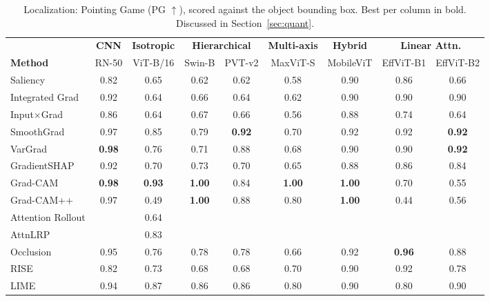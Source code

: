 \documentclass[final,5p,times,twocolumn]{elsarticle}
\newcommand{\best}[1]{\textbf{#1}}
\newcommand{\nd}{\textemdash}
\begin{document}
\begin{table}[t]
  \centering
  \caption{Localization: Pointing Game (PG $\uparrow$), scored against the object bounding box. Best per column in bold. Discussed in Section~\ref{sec:quant}.}
  \label{tab:pg}
  \setlength{\tabcolsep}{4pt}
  \begin{tabular}{l cc cc cc cc}
    \toprule
     & \multicolumn{1}{c}{\textbf{CNN}} & \multicolumn{1}{c}{\textbf{Isotropic}} & \multicolumn{2}{c}{\textbf{Hierarchical}} & \multicolumn{1}{c}{\textbf{Multi-axis}} & \multicolumn{1}{c}{\textbf{Hybrid}} & \multicolumn{2}{c}{\textbf{Linear Attn.}} \\
    \cmidrule(lr){2-2} \cmidrule(lr){3-3} \cmidrule(lr){4-5} \cmidrule(lr){6-6} \cmidrule(lr){7-7} \cmidrule(lr){8-9}
    \textbf{Method} & RN-50 & ViT-B/16 & Swin-B & PVT-v2 & MaxViT-S & MobileViT & EffViT-B1 & EffViT-B2 \\
    \midrule
    Saliency & 0.82 & 0.65 & 0.62 & 0.62 & 0.58 & 0.90 & 0.86 & 0.66 \\
    Integrated Grad & 0.92 & 0.64 & 0.66 & 0.64 & 0.62 & 0.90 & 0.90 & 0.90 \\
    Input$\times$Grad & 0.86 & 0.64 & 0.67 & 0.66 & 0.56 & 0.88 & 0.74 & 0.64 \\
    SmoothGrad & 0.97 & 0.85 & 0.79 & \best{0.92} & 0.70 & 0.92 & 0.92 & \best{0.92} \\
    VarGrad & \best{0.98} & 0.76 & 0.71 & 0.88 & 0.68 & 0.90 & 0.90 & \best{0.92} \\
    GradientSHAP & 0.92 & 0.70 & 0.73 & 0.70 & 0.65 & 0.88 & 0.86 & 0.84 \\
    \midrule
    Grad-CAM & \best{0.98} & \best{0.93} & \best{1.00} & 0.84 & \best{1.00} & \best{1.00} & 0.70 & 0.55 \\
    Grad-CAM++ & 0.97 & 0.49 & \best{1.00} & 0.88 & 0.80 & \best{1.00} & 0.44 & 0.56 \\
    \midrule
    Attention Rollout & \nd & 0.64 & \nd & \nd & \nd & \nd & \nd & \nd \\
    AttnLRP &\nd & 0.83 & \nd & \nd & \nd & \nd & \nd & \nd \\
    \midrule
    Occlusion & 0.95 & 0.76 & 0.78 & 0.78 & 0.66 & 0.92 & \best{0.96} & 0.88 \\
    RISE & 0.82 & 0.73 & 0.68 & 0.68 & 0.70 & 0.90 & 0.92 & 0.78 \\
    LIME & 0.94 & 0.87 & 0.86 & 0.86 & 0.80 & 0.90 & 0.80 & 0.90 \\
    \bottomrule
  \end{tabular}
\end{table}
\end{document}

